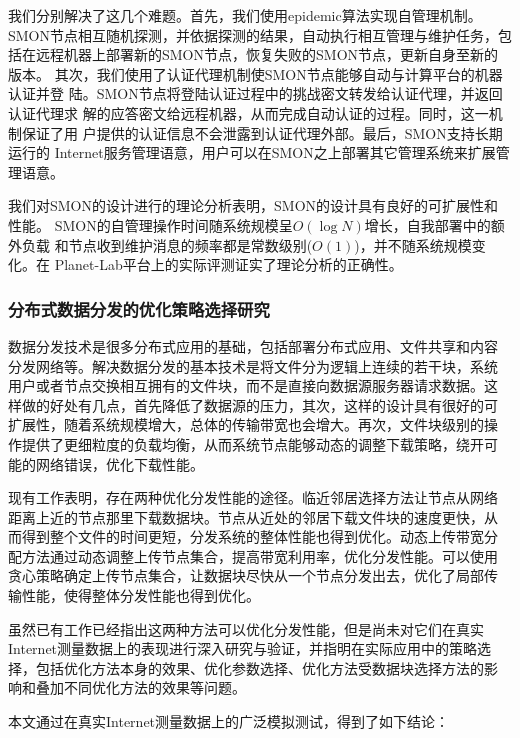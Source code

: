我们分别解决了这几个难题。首先，我们使用epidemic算法实现自管理机制。
SMON节点相互随机探测，并依据探测的结果，自动执行相互管理与维护任务，包
括在远程机器上部署新的SMON节点，恢复失败的SMON节点，更新自身至新的版本。
其次，我们使用了认证代理机制使SMON节点能够自动与计算平台的机器认证并登
陆。SMON节点将登陆认证过程中的挑战密文转发给认证代理，并返回认证代理求
解的应答密文给远程机器，从而完成自动认证的过程。同时，这一机制保证了用
户提供的认证信息不会泄露到认证代理外部。最后，SMON支持长期运行的
Internet服务管理语意，用户可以在SMON之上部署其它管理系统来扩展管理语意。

我们对SMON的设计进行的理论分析表明，SMON的设计具有良好的可扩展性和性能。
SMON的自管理操作时间随系统规模呈$O(\log N)$增长，自我部署中的额外负载
和节点收到维护消息的频率都是常数级别($O(1)$)，并不随系统规模变化。在
Planet-Lab平台上的实际评测证实了理论分析的正确性。

\subsubsection*{分布式数据分发的优化策略选择研究}

数据分发技术是很多分布式应用的基础，包括部署分布式应用、文件共享和内容
分发网络等。解决数据分发的基本技术是将文件分为逻辑上连续的若干块，系统
用户或者节点交换相互拥有的文件块，而不是直接向数据源服务器请求数据。这
样做的好处有几点，首先降低了数据源的压力，其次，这样的设计具有很好的可
扩展性，随着系统规模增大，总体的传输带宽也会增大。再次，文件块级别的操
作提供了更细粒度的负载均衡，从而系统节点能够动态的调整下载策略，绕开可
能的网络错误，优化下载性能。

现有工作表明，存在两种优化分发性能的途径。临近邻居选择方法让节点从网络
距离上近的节点那里下载数据块。节点从近处的邻居下载文件块的速度更快，从
而得到整个文件的时间更短，分发系统的整体性能也得到优化。动态上传带宽分
配方法通过动态调整上传节点集合，提高带宽利用率，优化分发性能。可以使用
贪心策略确定上传节点集合，让数据块尽快从一个节点分发出去，优化了局部传
输性能，使得整体分发性能也得到优化。

虽然已有工作已经指出这两种方法可以优化分发性能，但是尚未对它们在真实
Internet测量数据上的表现进行深入研究与验证，并指明在实际应用中的策略选
择，包括优化方法本身的效果、优化参数选择、优化方法受数据块选择方法的影
响和叠加不同优化方法的效果等问题。


本文通过在真实Internet测量数据上的广泛模拟测试，得到了如下结论：

